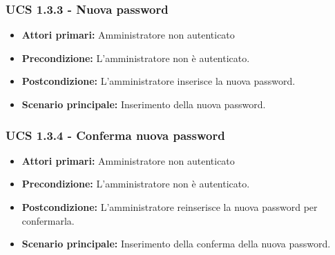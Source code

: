 \subsubsection{UCS 1.3.3 - Nuova password}
\begin{itemize}
\item \textbf{Attori primari:} Amministratore non autenticato
\item \textbf{Precondizione:}  L'amministratore non è autenticato.
\item \textbf{Postcondizione:} L'amministratore inserisce la nuova password.
\item \textbf{Scenario principale:} Inserimento della nuova password.
\end{itemize}

\subsubsection{UCS 1.3.4 - Conferma nuova password}
\begin{itemize}
\item \textbf{Attori primari:} Amministratore non autenticato
\item \textbf{Precondizione:} L'amministratore non è autenticato.
\item \textbf{Postcondizione:} L'amministratore reinserisce la nuova password per confermarla.
\item \textbf{Scenario principale:} Inserimento della conferma della nuova password.
\end{itemize}

